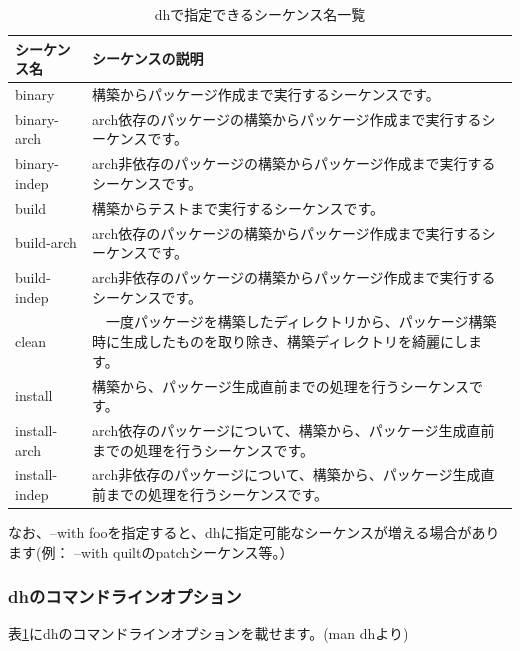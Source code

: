 \documentclass[mingoth,a4paper]{jsarticle}
\begin{document}
\begin{table}[ht]
\begin{center}
\small
\begin{tabular}{|p{8em}|p{35em}|}
\hline
シーケンス名&シーケンスの説明 \\
\hline
binary & 構築からパッケージ作成まで実行するシーケンスです。\\
binary-arch & arch依存のパッケージの構築からパッケージ作成まで実行するシーケンスです。\\
binary-indep & arch非依存のパッケージの構築からパッケージ作成まで実行するシーケンスです。\\
build & 構築からテストまで実行するシーケンスです。\\
build-arch & arch依存のパッケージの構築からパッケージ作成まで実行するシーケンスです。\\
build-indep & arch非依存のパッケージの構築からパッケージ作成まで実行するシーケンスです。\\
clean &　一度パッケージを構築したディレクトリから、パッケージ構築時に生成したものを取り除き、構築ディレクトリを綺麗にします。\\
install & 構築から、パッケージ生成直前までの処理を行うシーケンスです。\\
install-arch & arch依存のパッケージについて、構築から、パッケージ生成直前までの処理を行うシーケンスです。\\
install-indep & arch非依存のパッケージについて、構築から、パッケージ生成直前までの処理を行うシーケンスです。\\
\hline
\end{tabular}
\caption{dhで指定できるシーケンス名一覧}
\label{tab:sequence-dh}
\end{center}
\end{table}

なお、--with fooを指定すると、dhに指定可能なシーケンスが増える場合があります(例： --with quiltのpatchシーケンス等。）

\subsubsection{dhのコマンドラインオプション}

表\ref{tab:sequence-dh}にdhのコマンドラインオプションを載せます。(man dhより)
\end{document}
